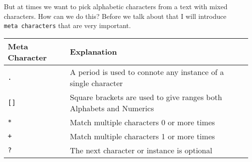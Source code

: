 \documentclass[ignorenonframetext,]{beamer}
\begin{document}
\begin{frame}[fragile]

But at times we want to pick alphabetic characters from a text with
mixed characters. How can we do this? Before we talk about that I will
introduce \texttt{meta\ characters} that are very important.

\begin{longtable}[]{@{}ll@{}}
\toprule
\begin{minipage}[b]{0.39\columnwidth}\raggedright
Meta Character\strut
\end{minipage} & \begin{minipage}[b]{0.55\columnwidth}\raggedright
Explanation\strut
\end{minipage}\tabularnewline
\midrule
\endhead
\begin{minipage}[t]{0.39\columnwidth}\raggedright
\texttt{.}\strut
\end{minipage} & \begin{minipage}[t]{0.55\columnwidth}\raggedright
A period is used to connote any instance of a single character\strut
\end{minipage}\tabularnewline
\begin{minipage}[t]{0.39\columnwidth}\raggedright
\texttt{{[}{]}}\strut
\end{minipage} & \begin{minipage}[t]{0.55\columnwidth}\raggedright
Square brackets are used to give ranges both Alphabets and
Numerics\strut
\end{minipage}\tabularnewline
\begin{minipage}[t]{0.39\columnwidth}\raggedright
\texttt{*}\strut
\end{minipage} & \begin{minipage}[t]{0.55\columnwidth}\raggedright
Match multiple characters 0 or more times\strut
\end{minipage}\tabularnewline
\begin{minipage}[t]{0.39\columnwidth}\raggedright
\texttt{+}\strut
\end{minipage} & \begin{minipage}[t]{0.55\columnwidth}\raggedright
Match multiple characters 1 or more times\strut
\end{minipage}\tabularnewline
\begin{minipage}[t]{0.39\columnwidth}\raggedright
\texttt{?}\strut
\end{minipage} & \begin{minipage}[t]{0.55\columnwidth}\raggedright
The next character or instance is optional\strut

\end{minipage}
\end{longtable}
\end{frame}
\end{document}
